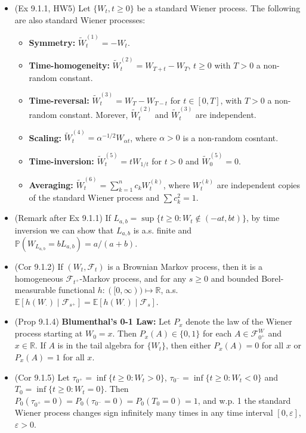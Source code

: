 \documentclass[twoside]{article}
\newcommand{\dis}{\displaystyle}
\newcommand\bbE{\mathbb{E}}
\newcommand\bbP{\mathbb{P}}
\newcommand\bbR{\mathbb{R}}
\newcommand\calF{\mathcal{F}}
\def\eps{\varepsilon}
\begin{document}
\begin{itemize}
\item (Ex 9.1.1, HW5) Let $\{ W_t, t \geq 0\}$ be a standard Wiener process. The following are also standard Wiener processes:
\begin{itemize}
\item \textbf{Symmetry:} $\widetilde{W}_t^{(1)} = -W_t$.
\item \textbf{Time-homogeneity:} $\widetilde{W}_t^{(2)} = W_{T+t} - W_T$, $t \geq 0$ with $T > 0$ a non-random constant.
\item \textbf{Time-reversal:} $\widetilde{W}_t^{(3)} = W_T - W_{T-t}$ for $t \in [0,T]$, with $T > 0$ a non-random constant. Morever, $\widetilde{W}_t^{(2)}$ and $\widetilde{W}_t^{(3)}$ are independent.
\item \textbf{Scaling:} $\widetilde{W}_t^{(4)} = \alpha^{-1/2}W_{\alpha t}$, where $\alpha > 0$ is a non-random cosntant.
\item \textbf{Time-inversion:} $\widetilde{W}_t^{(5)} = tW_{1/t}$ for $t > 0$ and $\widetilde{W}_0^{(5)} = 0$.
\item \textbf{Averaging:} $\widetilde{W}_t^{(6)} = \dis\sum_{k=1}^n c_k W_t^{(k)}$, where $W_t^{(k)}$ are independent copies of the standard Wiener process and $\sum c_k^2 = 1$.
\end{itemize}

\item (Remark after Ex 9.1.1) If $L_{a,b} = \sup \{t \geq 0: W_t \notin (-at, bt) \}$, by time inversion we can show that $L_{a,b}$ is a.s. finite and $\bbP(W_{L_{a,b}} = bL_{a,b}) = a/(a+b)$.

\item (Cor 9.1.2) If $(W_t,\calF_t)$ is a Brownian Markov process, then it is a homogeneous $\calF_{t^+}$-Markov process, and for any $s \geq 0$ and bounded Borel-measurable functional $h: ([0,\infty)) \mapsto \bbR$, a.s. $\bbE [h(W_\cdot) \mid \calF_{s^+}] = \bbE [h(W_\cdot) \mid \calF_s]$.

\item (Prop 9.1.4) \textbf{Blumenthal's 0-1 Law:} Let $P_x$ denote the law of the Wiener process starting at $W_0 = x$. Then $P_x(A) \in \{ 0,1\}$ for each $A \in \calF_{0^+}^W$ and $x \in \bbR$. If $A$ is in the tail algebra for $\{ W_t\}$, then either $P_x(A) = 0$ for all $x$ or $P_x(A) = 1$ for all $x$.

\item (Cor 9.1.5) Let $\tau_{0^+} = \inf \{ t \geq 0: W_t > 0\}$, $\tau_{0^-} = \inf \{ t \geq 0: W_t < 0\}$ and $T_0 = \inf \{ t \geq 0: W_t = 0\}$. Then $P_0(\tau_{0^+} = 0) = P_0(\tau_{0^-} = 0) = P_0(T_0 = 0) = 1$, and w.p. 1 the standard Wiener process changes sign infinitely many times in any time interval $[0, \eps]$, $\eps > 0$.


\end{itemize}
\end{document}
